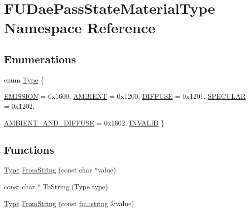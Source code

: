 \hypertarget{namespaceFUDaePassStateMaterialType}{
\section{FUDaePassStateMaterialType Namespace Reference}
\label{namespaceFUDaePassStateMaterialType}
}
\subsection*{Enumerations}
\begin{DoxyCompactItemize}
\item 
enum \hyperlink{namespaceFUDaePassStateMaterialType_a2fa49d07f22c50ef1605547df2ffd1b6}{Type} \{ \par
\hyperlink{namespaceFUDaePassStateMaterialType_a2fa49d07f22c50ef1605547df2ffd1b6a01c439c93f926ebc6e1cf7c1aac53fe4}{EMISSION} =  0x1600, 
\hyperlink{namespaceFUDaePassStateMaterialType_a2fa49d07f22c50ef1605547df2ffd1b6a182f65e0082a31b72d0ba14d84e541fb}{AMBIENT} =  0x1200, 
\hyperlink{namespaceFUDaePassStateMaterialType_a2fa49d07f22c50ef1605547df2ffd1b6ae1f70fb4a8ac3dad1fddec15ceebc767}{DIFFUSE} =  0x1201, 
\hyperlink{namespaceFUDaePassStateMaterialType_a2fa49d07f22c50ef1605547df2ffd1b6a9a6397330ba801b53dc6c3354bb0589d}{SPECULAR} =  0x1202, 
\par
\hyperlink{namespaceFUDaePassStateMaterialType_a2fa49d07f22c50ef1605547df2ffd1b6a94ba4befd8e22ca7e06d98a891947932}{AMBIENT\_\-AND\_\-DIFFUSE} =  0x1602, 
\hyperlink{namespaceFUDaePassStateMaterialType_a2fa49d07f22c50ef1605547df2ffd1b6adac47d1a2b36dd12c192ca4b333861b0}{INVALID}
 \}
\end{DoxyCompactItemize}
\subsection*{Functions}
\begin{DoxyCompactItemize}
\item 
\hyperlink{namespaceFUDaePassStateMaterialType_a2fa49d07f22c50ef1605547df2ffd1b6}{Type} \hyperlink{namespaceFUDaePassStateMaterialType_a7578d9cd6b29d67b0c03729f4401bdf3}{FromString} (const char $\ast$value)
\item 
const char $\ast$ \hyperlink{namespaceFUDaePassStateMaterialType_aa95b37d0687e3ed5d591c89019d2defd}{ToString} (\hyperlink{namespaceFUDaePassStateMaterialType_a2fa49d07f22c50ef1605547df2ffd1b6}{Type} type)
\item 
\hyperlink{namespaceFUDaePassStateMaterialType_a2fa49d07f22c50ef1605547df2ffd1b6}{Type} \hyperlink{namespaceFUDaePassStateMaterialType_abc4123d5d250696a3c575849cdd1984a}{FromString} (const \hyperlink{classfm_1_1stringT}{fm::string} \&value)
\end{DoxyCompactItemize}


